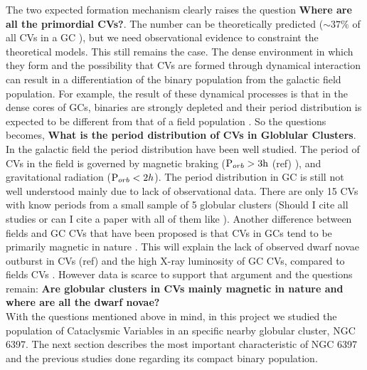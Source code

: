 The two expected formation mechanism clearly raises the question \textbf{Where are all the primordial CVs?}. The number can be theoretically predicted ($\sim 37 \%$ of all CVs in a GC \citep{ivanova_formation_2006}), but we need observational evidence to constraint the theoretical models. This still remains the case. The dense environment in which they form and the possibility that CVs are formed through dynamical interaction can result in a differentiation of the binary population from the galactic field population. For example, the result of these dynamical processes is that in the dense cores of GCs, binaries are strongly depleted and their period distribution is expected to be different from that of a field population \citep{ivanova_evolution_2005}. So the questions becomes, \textbf{What is the period distribution of CVs in Globlular Clusters}. In the galactic field the period distribution have been well studied. The period of CVs in the field is governed by magnetic braking ($\text P _{orb} > 3 \text h$ (ref) ), and gravitational radiation ($\text P _{orb} < 2 h$). The period distribution in GC is still not well understood mainly due to lack of observational data. There are only 15 CVs with know periods from a small sample of 5 globular clusters (Should I cite all studies or can I cite a paper with all of them like  \cite{knigge_cataclysmic_2012}). Another difference between fields and GC CVs that have been proposed is that CVs in GCs tend to be primarily magnetic in nature \citep{grindlay_magnetic_1999}. This will explain the lack of observed dwarf novae outburst in CVs (ref) and the high X-ray luminosity of GC CVs, compared to fields CVs \citep{verbunt_cataclysmic_1997}. However data is scarce to support that argument and the questions remain: \textbf{Are globular clusters in CVs mainly magnetic in nature and where are all the dwarf novae?} \\

With the questions mentioned above in mind, in this project we studied the population of Cataclysmic Variables in an specific nearby globular cluster, NGC 6397. The next section describes the most important characteristic of NGC 6397 and the previous studies done regarding its compact binary population. 



